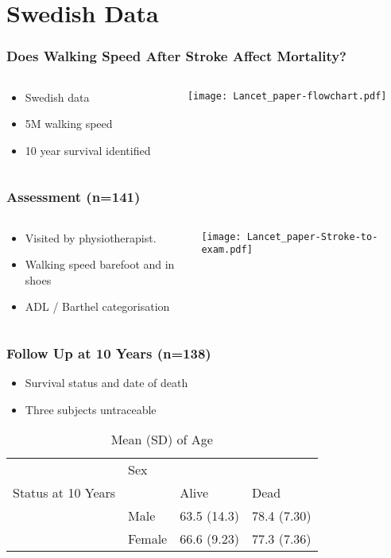 \documentclass{beamer}
\begin{document}
\section{Swedish Data}
\begin{frame}\frametitle{Does Walking Speed After Stroke Affect Mortality?}
	\begin{columns}
		\begin{column}{5cm}
		\begin{itemize}
		\item Swedish data
		\item 5M walking speed
		\item 10 year survival identified
		\end{itemize}
		\end{column}
		\begin{column}{5cm}
    \texttt{[image: Lancet\_paper-flowchart.pdf]}
		\end{column}
	\end{columns}
\end{frame}
\begin{frame}\frametitle{Assessment (n=141)}
	\begin{columns}
		\begin{column}{5cm}
		\begin{itemize}
		\item Visited by physiotherapist.
		\item Walking speed barefoot and in shoes
		\item ADL / Barthel categorisation
		\end{itemize}
		\end{column}
		\begin{column}{5cm}
    \texttt{[image: Lancet\_paper-Stroke-to-exam.pdf]}
		\end{column}
	\end{columns}

\end{frame}
\begin{frame}\frametitle{Follow Up at 10 Years (n=138)}
			\begin{itemize}
			\item Survival status and date of death
			\item Three subjects untraceable
			\end{itemize}
\begin{table}[ht]
\centering
\caption{Mean (SD) of Age} 
\begin{tabular}{llll}
  \hline
  \hline
 & Sex &  &  \\ 
  Status at 10 Years &  & Alive & Dead \\ 
   & Male & 63.5 (14.3) & 78.4 (7.30) \\ 
   & Female & 66.6 (9.23) & 77.3 (7.36) \\ 
   \hline
\end{tabular}
\end{table}\end{frame}
\end{document}
